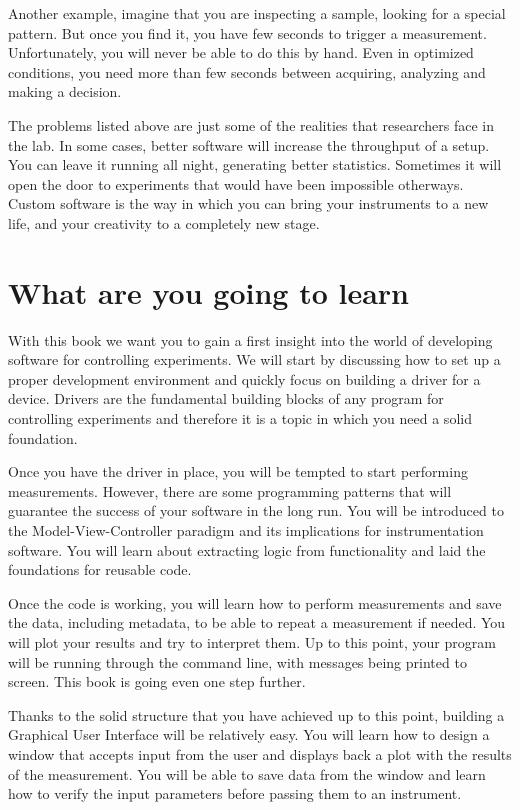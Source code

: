 Another example, imagine that you are inspecting a sample, looking for a special pattern. But once you find it, you have few seconds to trigger a measurement. Unfortunately, you will never be able to do this by hand. Even in optimized conditions, you need more than few seconds between acquiring, analyzing and making a decision. 

The problems listed above are just some of the realities that researchers face in the lab. In some cases, better software will increase the throughput of a setup. You can leave it running all night, generating better statistics. Sometimes it will open the door to experiments that would have been impossible otherways. Custom software is the way in which you can bring your instruments to a new life, and your creativity to a completely new stage. 

\section{What are you going to learn}
With this book we want you to gain a first insight into the world of developing software for controlling experiments. We will start by discussing how to set up a proper development environment and quickly focus on building a driver for a device. Drivers are the fundamental building blocks of any program for controlling experiments and therefore it is a topic in which you need a solid foundation. 

Once you have the driver in place, you will be tempted to start performing measurements. However, there are some programming patterns that will guarantee the success of your software in the long run. You will be introduced to the Model-View-Controller paradigm and its implications for instrumentation software. You will learn about extracting logic from functionality and laid the foundations for reusable code. 

Once the code is working, you will learn how to perform measurements and save the data, including metadata, to be able to repeat a measurement if needed. You will plot your results and try to interpret them. Up to this point, your program will be running through the command line, with messages being printed to screen. This book is going even one step further. 

Thanks to the solid structure that you have achieved up to this point, building a Graphical User Interface will be relatively easy. You will learn how to design a window that accepts input from the user and displays back a plot with the results of the measurement. You will be able to save data from the window and learn how to verify the input parameters before passing them to an instrument. 

